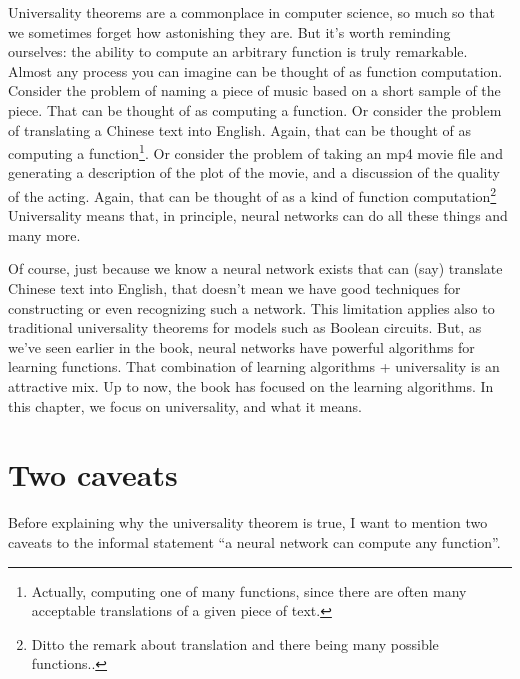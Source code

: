 \documentclass[a4paper,twoside,10pt]{book}
\begin{document}
Universality theorems are a commonplace in computer science, so much so that we sometimes forget how astonishing they are. But it's worth reminding ourselves: the ability to compute an arbitrary function is truly remarkable. Almost any process you can imagine can be thought of as function computation. Consider the problem of naming a piece of music based on a short sample of the piece. That can be thought of as computing a function. Or consider the problem of translating a Chinese text into English. Again, that can be thought of as computing a function\footnote{Actually, computing one of many functions, since there are often many acceptable translations of a given piece of text.}. Or consider the problem of taking an mp4 movie file and generating a description of the plot of the movie, and a discussion of the quality of the acting. Again, that can be thought of as a kind of function computation\footnote{Ditto the remark about translation and there being many possible functions..} Universality means that, in principle, neural networks can do all these things and many more.

Of course, just because we know a neural network exists that can (say) translate Chinese text into English, that doesn't mean we have good techniques for constructing or even recognizing such a network. This limitation applies also to traditional universality theorems for models such as Boolean circuits. But, as we've seen earlier in the book, neural networks have powerful algorithms for learning functions. That combination of learning algorithms + universality is an attractive mix. Up to now, the book has focused on the learning algorithms. In this chapter, we focus on universality, and what it means.


\section{Two caveats}
Before explaining why the universality theorem is true, I want to mention two caveats to the informal statement ``a neural network can compute any function''.
\end{document}
